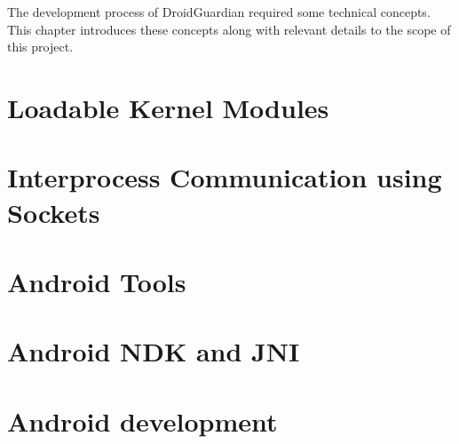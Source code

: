The development process of DroidGuardian required some technical concepts. This chapter introduces these concepts along with relevant details to the scope of this project.

\section{Loadable Kernel Modules}


\section{Interprocess Communication using Sockets}


\section{Android Tools}


\section{Android NDK and JNI}


\section{Android development}

